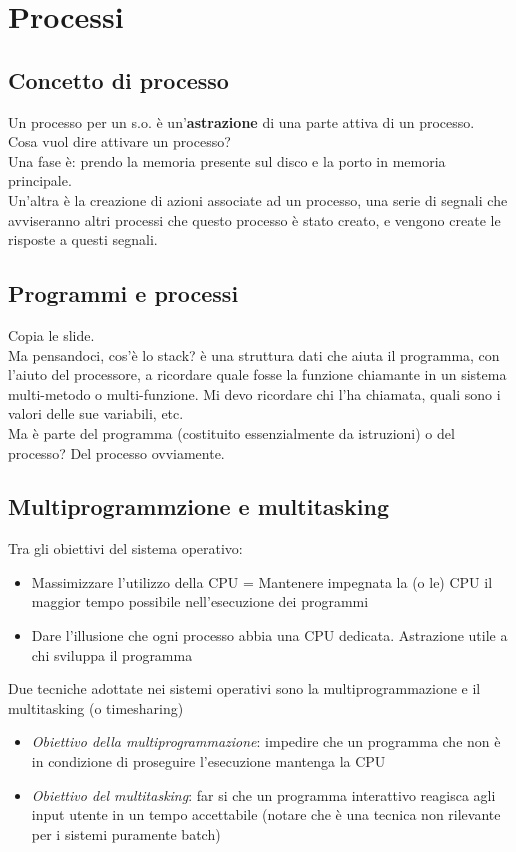 \chapter{Processi}
\section{Concetto di processo}
Un processo per un s.o. è un'\textbf{astrazione} di una parte attiva di un processo.
\\Cosa vuol dire attivare un processo?
\\Una fase è: prendo la memoria presente sul disco e la porto in memoria principale.
\\Un'altra è la creazione di azioni associate ad un processo, una serie di segnali che avviseranno altri processi che questo processo è stato creato, e vengono create le risposte a questi segnali.

\section{Programmi e processi}
Copia le slide.
\\Ma pensandoci, cos'è lo stack? è una struttura dati che aiuta il programma, con l'aiuto del processore, a ricordare quale fosse la funzione chiamante in un sistema multi-metodo o multi-funzione. Mi devo ricordare chi l'ha chiamata, quali sono i valori delle sue variabili, etc.
\\Ma è parte del programma (costituito essenzialmente da istruzioni) o del processo? Del processo ovviamente.

\section{Multiprogrammzione e multitasking}
Tra gli obiettivi del sistema operativo:
\begin{itemize}
    \item Massimizzare l'utilizzo della CPU = Mantenere impegnata la (o le) CPU il maggior tempo possibile nell'esecuzione dei programmi
    \item Dare l'illusione che ogni processo abbia una CPU dedicata. Astrazione utile a chi sviluppa il programma
\end{itemize}
Due tecniche adottate nei sistemi operativi sono la multiprogrammazione e il multitasking (o timesharing)
\begin{itemize}
    \item \textit{Obiettivo della multiprogrammazione}: impedire che un programma che non è in condizione di proseguire l'esecuzione mantenga la CPU
    \item \textit{Obiettivo del multitasking}: far si che un programma interattivo reagisca agli input utente in un tempo accettabile (notare che è una tecnica non rilevante per i sistemi puramente batch)
\end{itemize}


